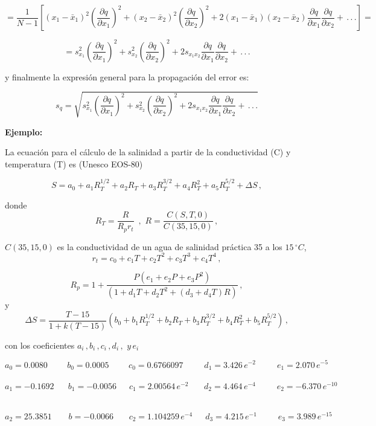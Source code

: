 \documentclass[
]{agujournal2019}
\begin{document}
\[=\frac{1}{N-1}\left[
\left(x_1 - \bar{x}_1\right)^2\left(\frac{\partial{q}}{\partial{x_1}}\right)^2 +
\left(x_2 - \bar{x}_2\right)^2\left(\frac{\partial{q}}{\partial{x_2}}\right)^2 +
2\left(x_1 - \bar{x}_1\right)\left(x_2 - \bar{x}_2\right)
\frac{\partial{q}}{\partial{x_1}}\frac{\partial{q}}{\partial{x_2}}+\,.\,.\,.\right]=\]

\[=s^2_{x_1}\left(\frac{\partial{q}}{\partial{x_1}}\right)^2 +
   s^2_{x_2}\left(\frac{\partial{q}}{\partial{x_2}}\right)^2+
   2 s_{{x_1}{x_2}}
   \frac{\partial{q}}{\partial{x_1}}\frac{\partial{q}}{\partial{x_2}}+\,.\,.\,.\]

y finalmente la expresión general para la propagación del error es:

\[s_{q}=\sqrt{s^2_{x_1}\left(\frac{\partial{q}}{\partial{x_1}}\right)^2 +
               s^2_{x_2}\left(\frac{\partial{q}}{\partial{x_2}}\right)^2+
                2 s_{{x_1}{x_2}}
                \frac{\partial{q}}{\partial{x_1}}\frac{\partial{q}}{\partial{x_2}}+\,.\,.\,.}\]

\vspace{0.5cm}

\textbf{Ejemplo:}

\noindent La ecuación para el cálculo de la salinidad a partir de la
conductividad (C) y temperatura (T) es (Unesco EOS-80)

\[S=a_0+a_1 R_T^{1/2}+a_2 R_T+a_3 R_T^{3/2}+a_4 R_T^{2}+a_5 R_T^{5/2}+\Delta{S}\,,\]

donde
\[R_T=\frac{R}{R_p r_t}\,\,\,,\,\,R=\frac{C(S,T,0)}{C(35,15,0)}\,,\]

\(C(35,15,0)\) es la conductividad de un agua de salinidad práctica 35 a
los \(15\,^\circ{ C}\),
\[r_t=c_0 + c_1 T + c_2 T^2 + c_3T^3 + c_4T^4\,,\]

\[R_p=1+\frac{P(e_1+e_2P+e_3P^2)}{(1+d_1T+d_2T^2+(d_3 + d_4T)R)}\,,\] y
\[\Delta{S}=\frac{T-15}{1+k(T-15)}(b_0+b_1 R_T^{1/2}+b_2 R_T+b_3 R_T^{3/2}+b_4 R_T^{2}+b_5 R_T^{5/2})\,,\]

con los coeficientes \(a_i\,,b_i\,,c_i\,,d_i\,,\,\,y\,e_i\)~

\(a_0=0.0080\,\,\,\,\,\,\,\,\,\,\,\,\,\,b_0=0.0005\,\,\,\,\,\,\,\,\,\,\,\,\,\,c_0=0.6766097\,\,\,\,\,\,\,\,\,\,\,\,\,\,\,d_1=3.426\,e^{-2}\,\,\,\,\,\,\,\,\,\,\,\,\,\,\,e_1=2.070\,e^{-5}\)
~\(a_1=-0.1692\,\,\,\,\,\,\,\,\,\,b_1=-0.0056\,\,\,\,\,\,\,\,\,c_1=2.00564\,e^{-2}\,\,\,\,\,\,\,\,\,\,\,d_2=4.464\,e^{-4}\,\,\,\,\,\,\,\,\,\,\,\,\,\,\,e_2=-6.370\,e^{-10}\)
~

\(a_2=25.3851\,\,\,\,\,\,\,\,\,\,\,\,b=-0.0066\,\,\,\,\,\,\,\,\,\,\,c_2=1.104259\,e^{-4}\,\,\,\,\,\,\,\,\,d_3=4.215\,e^{-1}\,\,\,\,\,\,\,\,\,\,\,\,\,\,\,e_3=3.989\,e^{-15}\)\\
\end{document}
